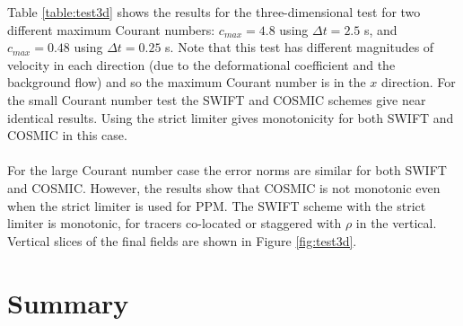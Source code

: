 \documentclass[11pt,a4paper]{article}
\begin{document}
Table \ref{table:test3d} shows the results for the three-dimensional test for two different maximum Courant numbers: $c_{max}=4.8$ using $\Delta t=2.5$ s, and $c_{max}=0.48$ using $\Delta t=0.25$ s. Note that this test has different magnitudes of velocity in each direction (due to the deformational coefficient and the background flow) and so the maximum Courant number is in the $x$ direction. For the small Courant number test the SWIFT and COSMIC schemes give near identical results. Using the strict limiter gives monotonicity for both SWIFT and COSMIC in this case.
\\
\\
For the large Courant number case the error norms are similar for both SWIFT and COSMIC. However, the results show that COSMIC is not monotonic even when the strict limiter is used for PPM. The SWIFT scheme with the strict limiter is monotonic, for tracers co-located or staggered with $\rho$ in the vertical.
Vertical slices of the final fields are shown in Figure \ref{fig:test3d}.

\section{Summary}
\end{document}
